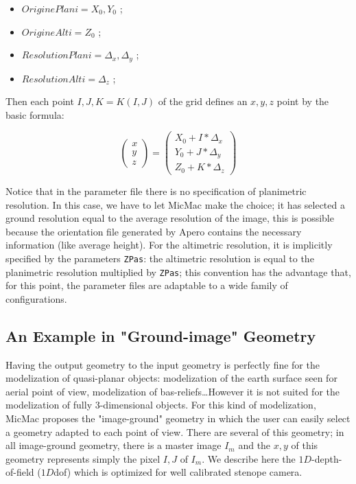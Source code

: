 \begin{itemize}
   \item  $OriginePlani=X_0,Y_0$  ; 
   \item  $OrigineAlti=Z_0$       ;

   \item  $ResolutionPlani=\Delta_x,\Delta_y$       ;
   \item  $ResolutionAlti=\Delta_z$       ;
\end{itemize}

Then each point $I,J,K=K(I,J)$ of the grid defines an $x,y,z$ point by the basic formula:


\begin{equation}
   \begin{pmatrix}  x \\ y \\ z \end{pmatrix}
   = \begin{pmatrix}  X_0 + I * \Delta_x \\ Y_0 + J * \Delta_y \\ Z_0 + K * \Delta_z \end{pmatrix}
\end{equation}

Notice that in the parameter file there is no specification of planimetric resolution. 
In this case, we have to let MicMac make the choice; it has selected a ground resolution 
equal to the average resolution of the image, this is possible because the orientation
file generated by Apero contains the necessary information (like average height).
For the altimetric resolution, it is implicitly specified by the parameters
{\tt ZPas}: the altimetric resolution is equal to the  planimetric resolution
multiplied by {\tt ZPas}; this convention has the advantage that, for this point, the parameter
files are adaptable to a wide family of configurations.


\subsection{An Example in "Ground-image" Geometry}

\label{EX:TER:IM:GEOM}

Having the output geometry  to the input geometry is perfectly fine for the
modelization of quasi-planar objects: modelization of the earth surface seen for aerial
point of view, modelization of bas-reliefs\dots However it is not suited for the
modelization of fully 3-dimensional objects.  For this kind of modelization, MicMac
proposes the "image-ground" geometry in which the user can easily select a geometry
adapted to each point of view. There are several  of this geometry; 
in all image-ground geometry, there is a master image $I_m$ and the $x,y$
of this geometry represents simply the pixel $I,J$ of $I_m$.
We describe here the $1D$-depth-of-field ($1D$dof)  which is optimized for well calibrated stenope camera.

